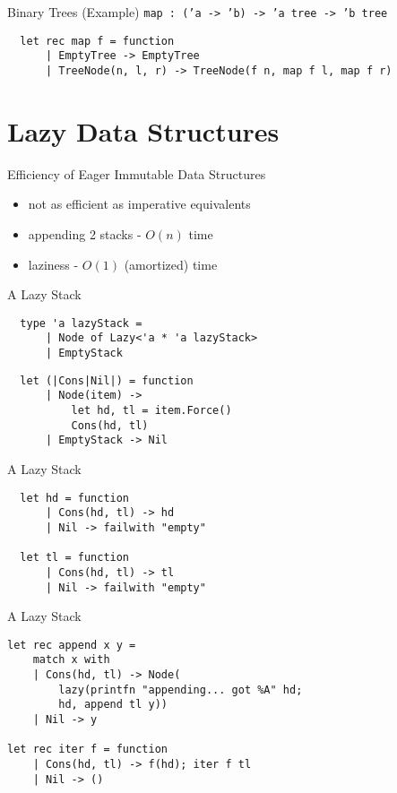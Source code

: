 \documentclass{beamer}
\begin{document}
\begin{frame}[fragile]{Binary Trees (Example)}
  \texttt{map : ('a -> 'b) -> 'a tree -> 'b tree}
  \pause
  \small
  \begin{verbatim}
  let rec map f = function
      | EmptyTree -> EmptyTree
      | TreeNode(n, l, r) -> TreeNode(f n, map f l, map f r)
  \end{verbatim}
\end{frame}

\section{Lazy Data Structures}
\frame{\tableofcontents[currentsection]}

\begin{frame}{Efficiency of Eager Immutable Data Structures}
  \begin{itemize}[<+->]
    \item not as efficient as imperative equivalents
    \item appending 2 stacks - $O(n)$ time
    \item laziness - $O(1)$ (amortized) time
  \end{itemize}
\end{frame}

\begin{frame}[fragile]{A Lazy Stack}
  \begin{verbatim}
  type 'a lazyStack =
      | Node of Lazy<'a * 'a lazyStack>
      | EmptyStack
  \end{verbatim}
  \pause
  \begin{verbatim}
  let (|Cons|Nil|) = function
      | Node(item) ->
          let hd, tl = item.Force()
          Cons(hd, tl)
      | EmptyStack -> Nil
  \end{verbatim}
\end{frame}

\begin{frame}[fragile]{A Lazy Stack}
  \begin{verbatim}
  let hd = function
      | Cons(hd, tl) -> hd
      | Nil -> failwith "empty"

  let tl = function
      | Cons(hd, tl) -> tl
      | Nil -> failwith "empty"
\end{verbatim}
\end{frame}

\begin{frame}[fragile]{A Lazy Stack}
  \begin{verbatim}
let rec append x y =
    match x with
    | Cons(hd, tl) -> Node(
        lazy(printfn "appending... got %A" hd;
        hd, append tl y))
    | Nil -> y

let rec iter f = function
    | Cons(hd, tl) -> f(hd); iter f tl
    | Nil -> ()
  \end{verbatim}
\end{frame}
\end{document}
